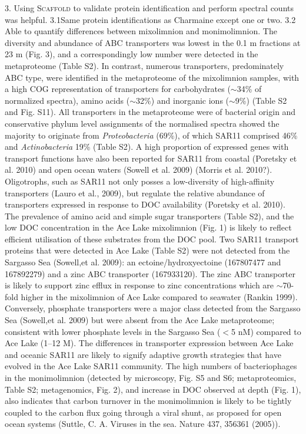 3. Using \textsc{Scaffold} to validate protein identification and perform spectral counts was helpful. 
3.1Same protein identifications as Charmaine except one or two.
3.2 Able to quantify differences between mixolimnion and monimolimnion.
The diversity and abundance of \ac{ABC} transporters was lowest in the 0.1 \textmu{}m fractions at 23 m (Fig. 3), and a correspondingly low number were detected in the metaproteome (Table S2). 
In contrast, numerous transporters, predominately \ac{ABC} type, were identified in the metaproteome of the mixolimnion samples, with a high \ac{COG} representation of transporters for carbohydrates ($\sim$34\% of normalized spectra), amino acids ($\sim$32\%) and inorganic ions ($\sim$9\%) (Table S2 and Fig. S11).
All transporters in the metaproteome were of bacterial origin and conservative phylum level assignments of the normalised spectra showed the majority to originate from \emph{Proteobacteria} (69\%), 
of which SAR11 comprised 46\% and \emph{Actinobacteria} 19\% (Table S2). 
A high proportion of expressed genes with transport functions have also been reported for SAR11 from coastal (Poretsky et al. 2010) and open ocean waters (Sowell et al. 2009) (Morris et al. 2010?). 
Oligotrophs, such as SAR11 not only posses a low-diversity of high-affinity transporters (Lauro et al., 2009), but regulate the relative abundance of transporters expressed in response to \ac{DOC} availability (Poretsky et al. 2010). 
The prevalence of amino acid and simple sugar transporters (Table S2), and the low \ac{DOC} concentration in the Ace Lake mixolimnion (Fig. 1) is likely to reflect efficient utilisation of these substrates from the \ac{DOC} pool. 
Two SAR11 transport proteins that were detected in Ace Lake (Table S2) were not detected from the Sargasso Sea (Sowell,et al. 2009): an ectoine/hydroxyectoine (167807477 and 167892279) and a zinc \ac{ABC} transporter (167933120). The zinc \ac{ABC} transporter is likely to support zinc efflux in response to zinc concentrations which are $\sim$70-fold higher in the mixolimnion of Ace Lake compared to seawater (Rankin 1999). 
Conversely, phosphate transporters were a major class detected from the Sargasso Sea (Sowell,et al. 2009) but were absent from the Ace Lake metaproteome; consistent with lower phosphate levels in the Sargasso Sea ($<$5 nM) compared to Ace Lake (1--12 \textmu{}M). The differences in transporter expression between Ace Lake and oceanic SAR11 are likely to signify adaptive growth strategies that have evolved in the Ace Lake SAR11 community.
The high numbers of bacteriophages in the monimolimnion (detected by microscopy, Fig. S5 and S6; metaproteomics, Table S2; metagenomics, Fig. 2), and increase in \ac{DOC} observed at depth (Fig. 1), also indicates that carbon turnover in the monimolimnion is likely to be tightly coupled to the carbon flux going through a viral shunt, as proposed for open ocean systems (Suttle, C. A. Viruses in the sea. Nature 437, 356361 (2005)). 
